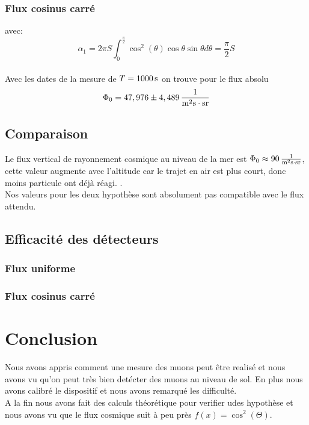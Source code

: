 \documentclass[a4paper,11pt,liststotocnumbered,bibtotocnumbered]{scrartcl}
\begin{document}
    

   \subsubsection{Flux cosinus carré}
avec:\\
\begin{equation*}
\alpha_1=2\pi S\int_0^{\frac{\pi}{2}}\cos^2(\theta)\cos\theta \sin\theta d \theta=\frac{\pi}{2} S
\end{equation*}\\
Avec les dates de la mesure de $T=\unit[1000]{s}$ on trouve pour le flux absolu
    \begin{equation*}
     \Phi_0=\unit[47,976\pm4,489]{\frac{1}{m^2s\cdot sr}} 
    \end{equation*}

   
   \subsection{Comparaison}
    Le flux vertical de rayonnement cosmique au niveau de la mer est $\Phi_0\approx\unit[90]{\frac{1}{m^2s\cdot sr}} $, cette valeur augmente avec l'altitude car le trajet en air est plus court, donc moins particule ont déjà réagi. .\\
    Nos valeurs pour les deux hypothèse sont absolument pas compatible avec le flux attendu.

   \subsection{Efficacité des détecteurs}
    \subsubsection{Flux uniforme}

    \subsubsection{Flux cosinus carré} 


    

 \section{Conclusion}
  Nous avons appris comment une mesure des muons peut être realisé et nous avons vu qu'on peut très bien detécter des muons au niveau de sol. En plus nous avons calibré le dispositif et nous avons remarqué les difficulté. \\
  A la fin nous avons fait des calculs théorétique pour verifier udes hypothèse et nous avons vu que le flux cosmique suit à peu près $f(x)=\cos^2(\Theta)$.
 
 
 \begin{appendix}
  
    

  \listoffigures  
 \end{appendix}
\end{document}
